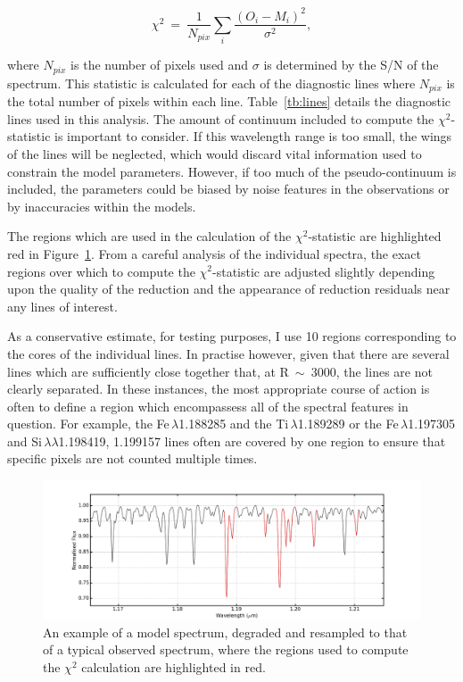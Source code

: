 \begin{equation}
    \chi^{2}~=~\frac{1}{N_{pix}}\sum\limits_{i}{\frac{(O_{i} - M_{i})^{2}}{\sigma^{2}}},\label{eq:chisq}
\end{equation}

where $N_{pix}$ is the number of pixels used
and $\sigma$ is determined by the S/N of the spectrum.
This statistic is calculated for each of the diagnostic lines where $N_{pix}$ is the total number of pixels within each line.
Table~\ref{tb:lines} details the diagnostic lines used in this analysis.
The amount of continuum included to compute the $\chi^{2}$-statistic is important to consider.
If this wavelength range is too small, the wings of the lines will be neglected,
which would discard vital information used to constrain the model parameters.
However, if too much of the pseudo-continuum is included, the parameters could be biased by noise features in the observations or by inaccuracies within the models.

The regions which are used in the calculation of the $\chi^{2}$-statistic are highlighted red in
Figure~\ref{fig:lines}.
From a careful analysis of the individual spectra, the exact regions over which to compute the $\chi^{2}$-statistic are adjusted slightly depending upon the quality of the reduction and the appearance of reduction residuals near any lines of interest.

As a conservative estimate, for testing purposes, I use 10 regions corresponding to the cores of the individual lines.
In practise however, given that there are several lines which are sufficiently
close together that, at R~$\sim$~3000,
the lines are not clearly separated.
In these instances, the most appropriate course of action is often to define a region which encompassess all of the spectral features in question.
For example, the Fe\,\1$\lambda$1.188285 and the Ti\,\1$\lambda$1.189289
or the Fe\,\1$\lambda$1.197305 and Si\,\1$\lambda\lambda$1.198419, 1.199157 lines often are covered by one region to ensure that specific pixels are not counted multiple times.


\begin{figure}
 \centering
 \includegraphics[width=\textwidth]{JAnal/Diag-lines}
 \caption[Diagnostic lines]{
An example of a model spectrum, degraded and resampled to that of a typical observed spectrum, where the regions used to compute the $\chi^{2}$ calculation are highlighted in red.
\label{fig:lines}
         }
\end{figure}

